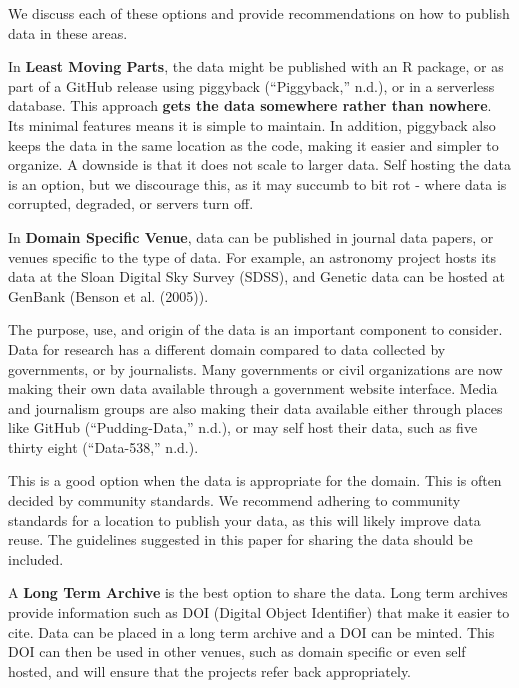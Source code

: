 \documentclass[
]{article}
\begin{document}
We discuss each of these options and provide recommendations on how to publish data in these areas.

In \textbf{Least Moving Parts}, the data might be published with an R package, or as part of a GitHub release using piggyback (``Piggyback,'' n.d.), or in a serverless database. This approach \textbf{gets the data somewhere rather than nowhere}. Its minimal features means it is simple to maintain. In addition, piggyback also keeps the data in the same location as the code, making it easier and simpler to organize. A downside is that it does not scale to larger data. Self hosting the data is an option, but we discourage this, as it may succumb to bit rot - where data is corrupted, degraded, or servers turn off.

In \textbf{Domain Specific Venue}, data can be published in journal data papers, or venues specific to the type of data. For example, an astronomy project hosts its data at the Sloan Digital Sky Survey (SDSS), and Genetic data can be hosted at GenBank (Benson et al. (2005)).

The purpose, use, and origin of the data is an important component to consider. Data for research has a different domain compared to data collected by governments, or by journalists. Many governments or civil organizations are now making their own data available through a government website interface. Media and journalism groups are also making their data available either through places like GitHub (``Pudding-Data,'' n.d.), or may self host their data, such as five thirty eight (``Data-538,'' n.d.).

This is a good option when the data is appropriate for the domain. This is often decided by community standards. We recommend adhering to community standards for a location to publish your data, as this will likely improve data reuse. The guidelines suggested in this paper for sharing the data should be included.

A \textbf{Long Term Archive} is the best option to share the data. Long term archives provide information such as DOI (Digital Object Identifier) that make it easier to cite. Data can be placed in a long term archive and a DOI can be minted. This DOI can then be used in other venues, such as domain specific or even self hosted, and will ensure that the projects refer back appropriately.
\end{document}

